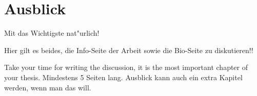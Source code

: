 \chapter{Ausblick}
  \label{Ausblick}

Mit das Wichtigste nat"urlich!

Hier gilt es beides, die Info-Seite der Arbeit sowie die Bio-Seite zu diskutieren!!

Take your time for writing the discussion, it is the most important chapter of your thesis.
\clearpage
Mindestens 5 Seiten lang.
\clearpage
Ausblick kann auch ein extra Kapitel werden, wenn man das will.
